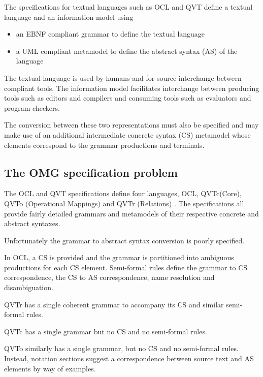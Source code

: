 \documentclass{llncs}
\begin{document}
The specifications for textual languages such as OCL and QVT define a textual language and an information model using
\begin{itemize}
\item an EBNF compliant grammar to define the textual language
\item a UML compliant metamodel to define the abstract syntax (AS) of the language
\end{itemize}
The textual language is used by humans and for source interchange between compliant tools. The information model facilitates interchange between producing tools such as editors and compilers and consuming tools such as evaluators and program checkers.

The conversion between these two representations must also be specified and may make use of an additional intermediate concrete syntax (CS) metamodel whose elements correspond to the grammar productions and terminals. 


\subsection{The OMG specification problem}

The OCL \cite{omg2013ocl} and QVT \cite{omg2014qvt} specifications define four languages, OCL, QVTc(Core), QVTo (Operational Mappings) and QVTr (Relations)%
. The specifications all provide fairly detailed grammars and metamodels of their respective concrete and abstract syntaxes.

Unfortunately the grammar to abstract syntax conversion is poorly specified.

In OCL, a CS is provided and the grammar is partitioned into ambiguous productions for each CS element. Semi-formal rules define the grammar to CS correspondence, the CS to AS correspondence, name resolution and disambiguation.

QVTr has a single coherent grammar to accompany its CS and similar semi-formal rules.

QVTc has a single grammar but no CS and no semi-formal rules.

QVTo similarly has a single grammar, but no CS and no semi-formal rules. Instead, notation sections suggest a correspondence between source text and AS elements by way of examples. 
\end{document}
